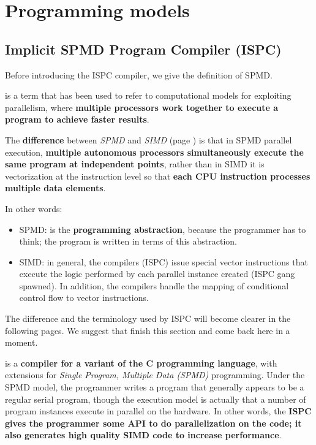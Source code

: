 \section{Programming models}

\subsection{Implicit SPMD Program Compiler (ISPC)}

Before introducing the ISPC compiler, we give the definition of SPMD.

\begin{definitionbox}
     is a term that has been used to refer to computational models for exploiting parallelism, where \textbf{multiple processors work together to execute a program to achieve faster results}.

    The \textbf{difference} between \emph{SPMD} and \emph{SIMD} (page \pageref{subsubsection: Single Instruction, Multiple Data (SIMD) processor}) is that in SPMD parallel execution, \textbf{multiple autonomous processors simultaneously execute the same program at independent points}, rather than in SIMD it is vectorization at the instruction level so that \textbf{each CPU instruction processes multiple data elements}.

    In other words:
    \begin{itemize}
        \item SPMD: is the \textbf{programming abstraction}, because the programmer has to think; the program is written in terms of this abstraction.
        \item SIMD: in general, the compilers (ISPC) issue special vector instructions that execute the logic performed by each parallel instance created (ISPC gang spawned). In addition, the compilers handle the mapping of conditional control flow to vector instructions.
    \end{itemize}
    The difference and the terminology used by ISPC will become clearer in the following pages. We suggest that finish this section and come back here in a moment.
\end{definitionbox}

\begin{definitionbox}
     is a \textbf{compiler for a variant of the C programming language}, with extensions for \emph{Single Program, Multiple Data (SPMD)} programming. Under the SPMD model, the programmer writes a program that generally appears to be a regular serial program, though the execution model is actually that a number of program instances execute in parallel on the hardware. In other words, the \textbf{ISPC gives the programmer some API to do parallelization on the code; it also generates high quality SIMD code to increase performance}.
\end{definitionbox}

